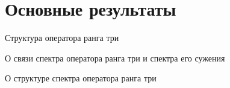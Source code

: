 \section{Основные результаты}

\begin{thm}{Структура оператора ранга три}
  
\end{thm}

\begin{thm}{О связи спектра оператора ранга три и спектра его сужения}
  
\end{thm}

\begin{thm}{О структуре спектра оператора ранга три}\*

  
\end{thm}
